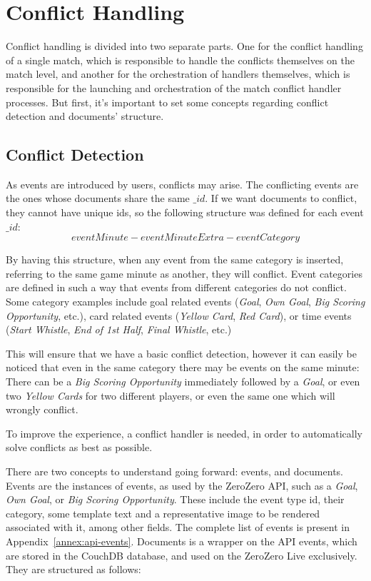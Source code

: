 \section{Conflict Handling}

Conflict handling is divided into two separate parts. One for the conflict handling of a single match, which is responsible to handle the conflicts themselves on the match level, and another for the orchestration of handlers themselves, which is responsible for the launching and orchestration of the match conflict handler processes. But first, it's important to set some concepts regarding conflict detection and documents' structure.

\subsection{Conflict Detection}

As events are introduced by users, conflicts may arise. The conflicting events are the ones whose documents share the same $\_id$. If we want documents to conflict, they cannot have unique ids, so the following structure was defined for each event $\_id$:
\begin{equation}
    eventMinute-eventMinuteExtra-eventCategory
\end{equation}

By having this structure, when any event from the same category is inserted, referring to the same game minute as another, they will conflict. Event categories are defined in such a way that events from different categories do not conflict. Some category examples include goal related events (\textit{Goal}, \textit{Own Goal}, \textit{Big Scoring Opportunity}, etc.), card related events (\textit{Yellow Card}, \textit{Red Card}), or time events (\textit{Start Whistle}, \textit{End of 1st Half}, \textit{Final Whistle}, etc.)

This will ensure that we have a basic conflict detection, however it can easily be noticed that even in the same category there may be events on the same minute: There can be a \textit{Big Scoring Opportunity} immediately followed by a \textit{Goal}, or even two \textit{Yellow Cards} for two different players, or even the same one which will wrongly conflict.

To improve the experience, a conflict handler is needed, in order to automatically solve conflicts as best as possible.

There are two concepts to understand going forward: events, and documents. Events are the instances of events, as used by the ZeroZero API, such as a \textit{Goal}, \textit{Own Goal}, or \textit{Big Scoring Opportunity}. These include the event type id, their category, some template text and a representative image to be rendered associated with it, among other fields. The complete list of events is present in Appendix~\ref{annex:api-events}. Documents is a wrapper on the API events, which are stored in the CouchDB database, and used on the ZeroZero Live exclusively. They are structured as follows:

